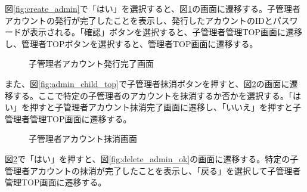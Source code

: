 \documentclass[a4j]{jarticle}
\begin{document}
図\ref{fig:create_admin}で「はい」を選択すると、図\ref{fig:new_admin}の画面に遷移する。子管理者アカウントの発行が完了したことを表示し、発行したアカウントのIDとパスワードが表示される。「確認」ボタンを選択すると、子管理者管理TOP画面に遷移し、管理者TOPボタンを選択すると、管理者TOP画面に遷移する。
\begin{figure}[H]
\centering
{}
\caption{子管理者アカウント発行完了画面}
\label{fig:new_admin}
\end{figure}
また、図\ref{fig:admin_child_top}で子管理者抹消ボタンを押すと、図\ref{fig:delete_admin}の画面に遷移する。ここで特定の子管理者のアカウントを抹消するか否かを選択する。「はい」を押すと子管理者アカウント抹消完了画面に遷移し、「いいえ」を押すと子管理者管理TOP画面に遷移する。
\begin{figure}[H]
\centering
{}
\caption{子管理者アカウント抹消画面}
\label{fig:delete_admin}
\end{figure}
図\ref{fig:delete_admin}で「はい」を押すと、図\ref{fig:delete_admin_ok}の画面に遷移する。特定の子管理者アカウントの抹消が完了したことを表示し、「戻る」を選択して子管理者管理TOP画面に遷移する。
\end{document}
